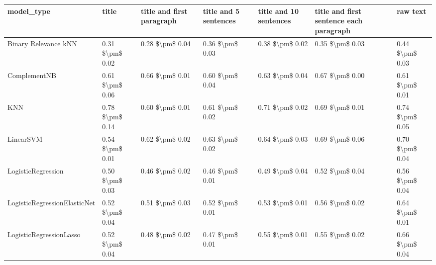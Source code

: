 \begin{tabular}{lllllll}
\toprule
                     model\_type &               title & title and first paragraph & title and 5 sentences & title and 10 sentences & title and first sentence each paragraph &        raw text \\
\midrule
           Binary Relevance kNN &     0.31 \$\textbackslash pm\$ 0.02 &           0.28 \$\textbackslash pm\$ 0.04 &       0.36 \$\textbackslash pm\$ 0.03 &        0.38 \$\textbackslash pm\$ 0.02 &                         0.35 \$\textbackslash pm\$ 0.03 & 0.44 \$\textbackslash pm\$ 0.03 \\
                   ComplementNB &     0.61 \$\textbackslash pm\$ 0.06 &           0.66 \$\textbackslash pm\$ 0.01 &       0.60 \$\textbackslash pm\$ 0.04 &        0.63 \$\textbackslash pm\$ 0.04 &                         0.67 \$\textbackslash pm\$ 0.00 & 0.61 \$\textbackslash pm\$ 0.01 \\
                            KNN &     0.78 \$\textbackslash pm\$ 0.14 &           0.60 \$\textbackslash pm\$ 0.01 &       0.61 \$\textbackslash pm\$ 0.02 &        0.71 \$\textbackslash pm\$ 0.02 &                         0.69 \$\textbackslash pm\$ 0.01 & 0.74 \$\textbackslash pm\$ 0.05 \\
                      LinearSVM &     0.54 \$\textbackslash pm\$ 0.01 &           0.62 \$\textbackslash pm\$ 0.02 &       0.63 \$\textbackslash pm\$ 0.02 &        0.64 \$\textbackslash pm\$ 0.03 &                         0.69 \$\textbackslash pm\$ 0.06 & 0.70 \$\textbackslash pm\$ 0.04 \\
             LogisticRegression &     0.50 \$\textbackslash pm\$ 0.03 &           0.46 \$\textbackslash pm\$ 0.02 &       0.46 \$\textbackslash pm\$ 0.01 &        0.49 \$\textbackslash pm\$ 0.04 &                         0.52 \$\textbackslash pm\$ 0.04 & 0.56 \$\textbackslash pm\$ 0.04 \\
   LogisticRegressionElasticNet &     0.52 \$\textbackslash pm\$ 0.04 &           0.51 \$\textbackslash pm\$ 0.03 &       0.52 \$\textbackslash pm\$ 0.01 &        0.53 \$\textbackslash pm\$ 0.01 &                         0.56 \$\textbackslash pm\$ 0.02 & 0.64 \$\textbackslash pm\$ 0.01 \\
        LogisticRegressionLasso &     0.52 \$\textbackslash pm\$ 0.04 &           0.48 \$\textbackslash pm\$ 0.02 &       0.47 \$\textbackslash pm\$ 0.01 &        0.55 \$\textbackslash pm\$ 0.01 &                         0.55 \$\textbackslash pm\$ 0.02 & 0.66 \$\textbackslash pm\$ 0.04 \\

\end{tabular}
